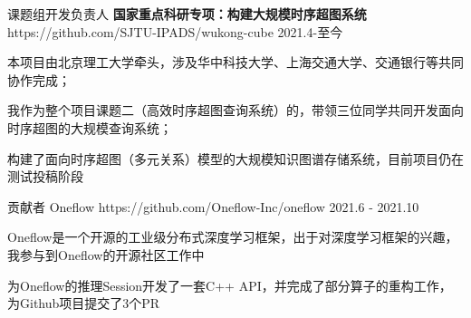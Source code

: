 


\begin{cventries}



\cventry
{课题组开发负责人} %
{\textbf{国家重点科研专项：构建大规模时序超图系统}} %
{https://github.com/SJTU-IPADS/wukong-cube} %
{2021.4-至今} %
{ %
    \begin{cvlargeitems}
        \item {本项目由北京理工大学牵头，涉及华中科技大学、上海交通大学、交通银行等共同协作完成；}
        \item {我作为整个项目课题二（高效时序超图查询系统）的，带领三位同学共同开发面向时序超图的大规模查询系统；}
        \item {构建了面向时序超图（多元关系）模型的大规模知识图谱存储系统，目前项目仍在测试投稿阶段}
    \end{cvlargeitems}
}

\vspace{-4mm}

\cventry
{贡献者} %
{Oneflow} %
{https://github.com/Oneflow-Inc/oneflow} %
{2021.6 - 2021.10} %
{ %
    \begin{cvlargeitems}
        \item {Oneflow是一个开源的工业级分布式深度学习框架，出于对深度学习框架的兴趣，我参与到Oneflow的开源社区工作中}
        \item {为Oneflow的推理Session开发了一套C++ API，并完成了部分算子的重构工作，为Github项目提交了3个PR}
    \end{cvlargeitems}
}


\end{cventries}
